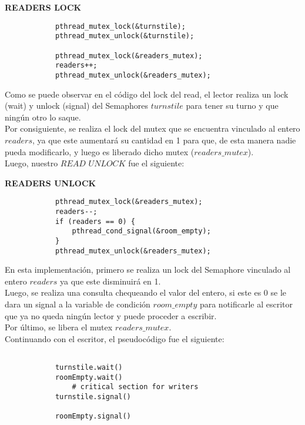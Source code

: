 \begin{center}
            \textbf{READERS LOCK}     
\end{center}

 
\begin{verbatim}
            pthread_mutex_lock(&turnstile);
            pthread_mutex_unlock(&turnstile);

            pthread_mutex_lock(&readers_mutex);
            readers++;
            pthread_mutex_unlock(&readers_mutex);
\end{verbatim}

Como se puede observar en el c\'{o}digo del lock del read, el lector realiza un lock (wait) y unlock (signal) del Semaphores $turnstile$
para tener su turno y que ningún otro lo saque.\\
Por consiguiente, se realiza el lock del mutex que se encuentra vinculado al entero $readers$, ya que este
aumentará su cantidad en 1 para que, de esta manera nadie pueda modificarlo, y luego es liberado dicho mutex ($readers\_mutex$).\\

Luego, nuestro $READ$ $UNLOCK$ fue el siguiente:\\

\begin{center}
            \textbf{READERS UNLOCK}
\end{center}

 
\begin{verbatim}
            pthread_mutex_lock(&readers_mutex);
            readers--;
            if (readers == 0) {
                pthread_cond_signal(&room_empty);		
            }
            pthread_mutex_unlock(&readers_mutex);
\end{verbatim}

En esta implementación, primero se realiza un lock del Semaphore vinculado al entero $readers$ ya que este disminuirá en 1.\\
Luego, se realiza una consulta chequeando el valor del entero, si este es 0 se le dara un signal a la variable de condici\'{o}n
$room\_empty$ para notificarle al escritor que ya no queda ning\'{u}n lector y puede proceder a escribir.\\
Por último, se libera el mutex $readers\_mutex$.\\

Continuando con el escritor, el pseudoc\'{o}digo fue el siguiente:\\

\begin{verbatim}

            turnstile.wait()
            roomEmpty.wait()
                # critical section for writers
            turnstile.signal()

            roomEmpty.signal()

\end{verbatim}

